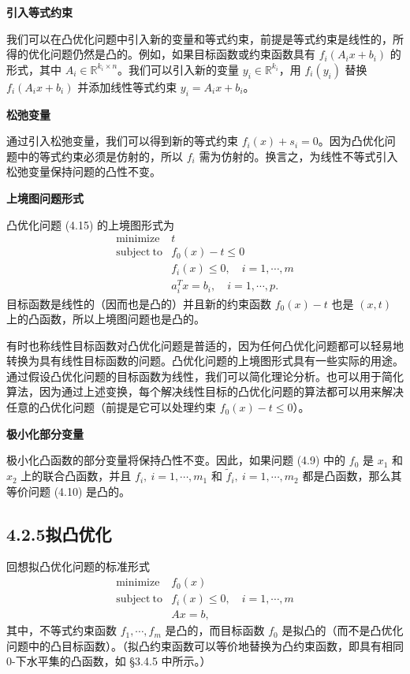 \documentclass[UTF8, 12pt, fontset=fandol, oneside]{ctexart}
\begin{document}
\noindent\textbf{引入等式约束}

我们可以在凸优化问题中引入新的变量和等式约束，前提是等式约束是线性的，所得的优化问题仍然是凸的。例如，如果目标函数或约束函数具有 $f_i(A_ix+b_i)$ 的形式，其中 $A_i\in\mathbb{R}^{k_i\times n}$。我们可以引入新的变量 $y_i\in\mathbb{R}^{k_i}$，用 $f_i(y_i)$ 替换 $f_i(A_ix+b_i)$ 并添加线性等式约束 $y_i=A_ix+b_i$。

\noindent\textbf{松弛变量}

通过引入松弛变量，我们可以得到新的等式约束 $f_i(x)+s_i=0$。因为凸优化问题中的等式约束必须是仿射的，所以 $f_i$ 需为仿射的。换言之，为线性不等式引入松弛变量保持问题的凸性不变。

\noindent\textbf{上境图问题形式}

凸优化问题 (4.15) 的上境图形式为
\[
\begin{array}{ll}
\mathop{\mathrm{minimize}} & t\\
\mathrm{subject\ to} & f_0(x)-t\leq 0\\
& f_i(x)\leq 0,\quad i=1,\cdots,m\\
& a_i^Tx=b_i,\quad i=1,\cdots,p.
\end{array}
\]
目标函数是线性的（因而也是凸的）并且新的约束函数 $f_0(x)-t$ 也是 $(x,t)$ 上的凸函数，所以上境图问题也是凸的。

有时也称线性目标函数对凸优化问题是普适的，因为任何凸优化问题都可以轻易地转换为具有线性目标函数的问题。凸优化问题的上境图形式具有一些实际的用途。通过假设凸优化问题的目标函数为线性，我们可以简化理论分析。也可以用于简化算法，因为通过上述变换，每个解决线性目标的凸优化问题的算法都可以用来解决任意的凸优化问题（前提是它可以处理约束 $f_0(x)-t\leq 0$）。

\noindent\textbf{极小化部分变量}

极小化凸函数的部分变量将保持凸性不变。因此，如果问题 (4.9) 中的 $f_0$ 是 $x_1$ 和 $x_2$ 上的联合凸函数，并且 $f_i,\ i=1,\cdots,m_1$ 和 $\tilde{f}_i,\ i=1,\cdots,m_2$ 都是凸函数，那么其等价问题 (4.10) 是凸的。

\subsection*{4.2.5\quad 拟凸优化}

回想拟凸优化问题的标准形式
\begin{equation}
\begin{array}{ll}
\mathop{\mathrm{minimize}} & f_0(x)\\
\mathrm{subject\ to} & f_i(x)\leq 0,\quad i=1,\cdots,m\\
& Ax=b,
\end{array}
\tag{4.24}
\end{equation}
其中，不等式约束函数 $f_1,\cdots,f_m$ 是凸的，而目标函数 $f_0$ 是拟凸的（而不是凸优化问题中的凸目标函数）。（拟凸约束函数可以等价地替换为凸约束函数，即具有相同 $0$-下水平集的凸函数，如 §3.4.5 中所示。）
\end{document}
